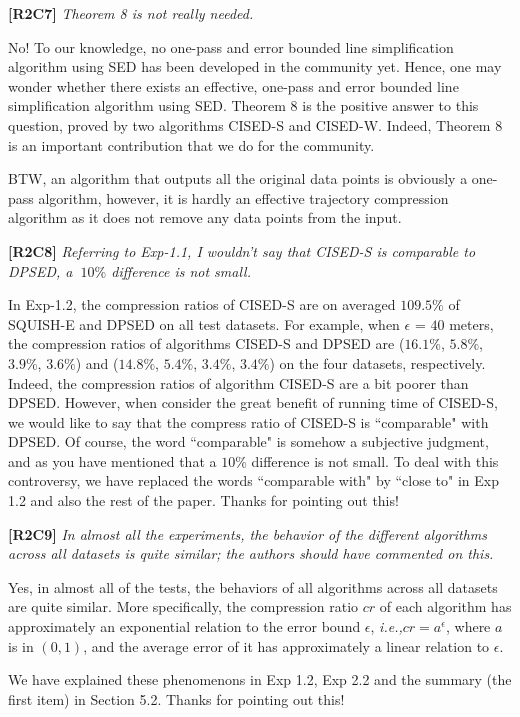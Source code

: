 \documentclass{letter}
\newcommand{\ie}{\emph{i.e.,}\xspace}
\begin{document}
\textbf{[R2C7]} \emph{Theorem 8 is not really needed.}

No! To our knowledge, no one-pass and error bounded line simplification algorithm using SED has been developed in the community yet. Hence, one may wonder whether there exists an effective, one-pass and error bounded line simplification algorithm using SED. Theorem 8 is the positive answer to this question, proved by two algorithms CISED-S and CISED-W. Indeed, Theorem 8 is an important contribution that we do for the community. 

BTW, an algorithm that outputs all the original data points is obviously a one-pass algorithm, however, it is hardly an effective trajectory compression algorithm as it does not remove any data points from the input.

\textbf{[R2C8]} \emph{Referring to Exp-1.1, I wouldn't say that CISED-S is comparable to DPSED, a $~10\%$ difference is not small.}

In Exp-1.2, the compression ratios of CISED-S are on averaged $109.5\%$ of SQUISH-E and DPSED on all test datasets. For example, when $\epsilon$ = $40$ meters, the compression ratios of algorithms CISED-S and DPSED are ($16.1\%$, $5.8\%$, $3.9\%$, $3.6\%$) and ($14.8\%$, $5.4\%$, $3.4\%$, $3.4\%$) on the four datasets, respectively. Indeed, the compression ratios of algorithm CISED-S are a bit poorer than DPSED. However, when consider the great benefit of running time of CISED-S, we would like to say that the compress ratio of CISED-S is ``comparable" with DPSED. 
%
Of course, the word ``comparable" is somehow a subjective judgment, and as you have mentioned that a $10\%$ difference is not small. To deal with this controversy, we have replaced the words ``comparable with" by ``close to" in Exp 1.2 and also the rest of the paper. Thanks for pointing out this!


\textbf{[R2C9]} \emph{In almost all the experiments, the behavior of the different algorithms across all datasets is quite similar; the authors should have commented on this.}

Yes, in almost all of the tests, the behaviors of all algorithms across all datasets are quite similar. More specifically, the compression ratio $cr$ of each algorithm has approximately an exponential relation to the error bound $\epsilon$, \ie $cr=a^\epsilon$, where $a$ is in $(0,1)$, and the average error of it has approximately a linear relation to $\epsilon$. 

We have explained these phenomenons in Exp 1.2, Exp 2.2 and the summary (the first item) in Section 5.2. Thanks for pointing out this!
\end{document}
